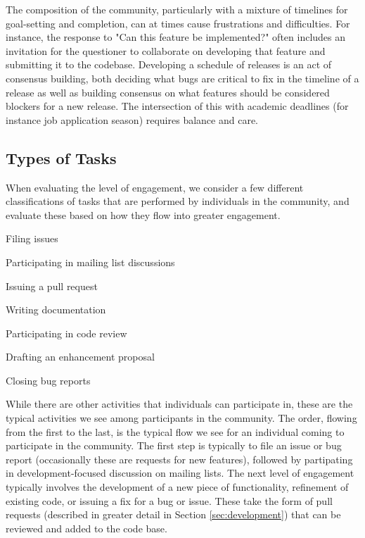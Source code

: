 The composition of the community, particularly with a mixture of timelines for
goal-setting and completion, can at times cause frustrations and difficulties.
For instance, the response to "Can this feature be implemented?" often includes
an invitation for the questioner to collaborate on developing that feature and
submitting it to the codebase.  Developing a schedule of releases is an act of
consensus building, both deciding what bugs are critical to fix in the timeline
of a release as well as building consensus on what features should be
considered blockers for a new release.  The intersection of this with academic
deadlines (for instance job application season) requires balance and care.

\subsection{Types of Tasks}

When evaluating the level of engagement, we consider a few different
classifications of tasks that are performed by individuals in the community,
and evaluate these based on how they flow into greater engagement.

\begin{itemize*}
  \item Filing issues
  \item Participating in mailing list discussions
  \item Issuing a pull request
  \item Writing documentation
  \item Participating in code review
  \item Drafting an enhancement proposal
  \item Closing bug reports
\end{itemize*}

While there are other activities that individuals can participate in, these are
the typical activities we see among participants in the community.  The order,
flowing from the first to the last, is the typical flow we see for an
individual coming to participate in the community.  The first step is typically
to file an issue or bug report (occasionally these are requests for new
features), followed by partipating in development-focused discussion on mailing
lists.  The next level of engagement typically involves the development of a
new piece of functionality, refinement of existing code, or issuing a fix for a
bug or issue.  These take the form of pull requests (described in greater
detail in Section \ref{sec:development}) that can be reviewed and added to the
code base.

